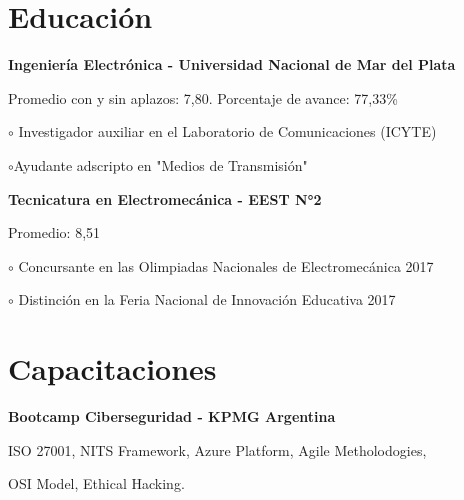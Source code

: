 \documentclass[a4paper,10pt]{article}
\begin{document}
\begin{adjustbox}{valign=t}
\begin{minipage}{0.60\textwidth} %
\section*{Educación}
\begin{description}
\raggedright
\item[ \textcolor{ColorOne}{2018-2023}] 
	\textbf{\justifying Ingeniería Electrónica - Universidad Nacional de \textbf{\hspace*{1.16cm}Mar del Plata }} \Myskip
    \item \justifying Promedio con y sin aplazos: 7,80. Porcentaje de avance: 77,33\%
    \item \textcolor{ColorOne}{$\circ$} \justifying Investigador auxiliar en el Laboratorio de Comunicaciones (ICYTE) 
    \item \textcolor{ColorOne}{$\circ$}\justifying  Ayudante adscripto en "Medios de Transmisión" \MySkip
 

\item[ \textcolor{ColorOne}{2011-2017}] 
	\textbf{\justifying Tecnicatura en Electromecánica - EEST N°2} \Myskip
    \item Promedio: 8,51
    \item \textcolor{ColorOne}{$\circ$} Concursante en las Olimpiadas Nacionales de Electromecánica 2017
    \item \textcolor{ColorOne}{$\circ$} Distinción en la Feria Nacional de Innovación Educativa 2017

\end{description}
\section*{Capacitaciones}
\begin{description}
\raggedright

\item[ \textcolor{ColorOne}{Nov.2021}] 
	\textbf{Bootcamp Ciberseguridad - KPMG Argentina} \Myskip
    \item \justifying ISO 27001, NITS Framework, Azure Platform, Agile Metholodogies, \item OSI Model, Ethical Hacking.\MySkip
\end{description}


\end{minipage}
\end{adjustbox}
\end{document}
